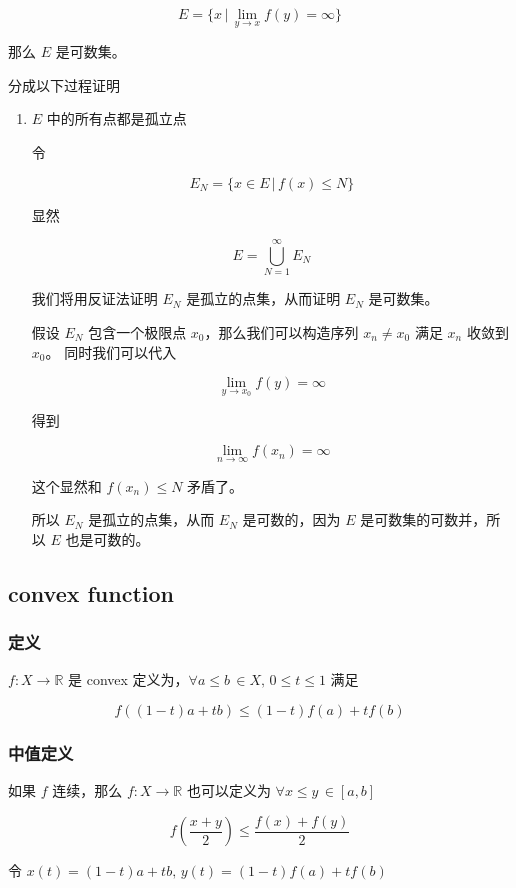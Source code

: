 \documentclass[12pt,a4paper]{ctexart}
\begin{document}
\[
E = \{ x \,\vert\, \lim_{y \to x}f(y) = \infty \}
\]

那么 $E$ 是可数集。

分成以下过程证明

\begin{enumerate}
    \item $E$ 中的所有点都是孤立点

令 

\[
E_N = \{ x \in E \,\vert\, f(x) \le N\}
\]

显然

\[
E = \bigcup_{N=1}^{\infty} E_N
\]

我们将用反证法证明 $E_N$ 是孤立的点集，从而证明 $E_N$ 是可数集。

假设 $E_N$ 包含一个极限点 $x_0$，那么我们可以构造序列 $x_n \ne x_0$ 满足 $x_n$ 收敛到 $x_0$。
同时我们可以代入 

\[
\lim_{y \to x_0}f(y) = \infty
\]

得到

\[
\lim_{n \to \infty}f(x_n) = \infty
\]

这个显然和 $f(x_n) \le N$ 矛盾了。

所以 $E_N$ 是孤立的点集，从而 $E_N$ 是可数的，因为 $E$ 是可数集的可数并，所以 $E$ 也是可数的。


\end{enumerate}

\subsection{convex function}

\subsubsection{定义}

$f: X \to \mathbb{R}$ 是 convex 定义为，$\forall a \le b\, \in X,\, 0 \le t \le 1$ 满足

\[
f((1-t)a + tb) \le (1-t)f(a) + tf(b)
\]

\subsubsection{中值定义}

如果 $f$ 连续，那么 $f: X \to \mathbb{R}$ 也可以定义为 $\forall x \le y\, \in [a,b]$

\[
f(\frac{x+y}{2}) \le \frac{f(x) + f(y)}{2}
\]

令 $x(t) = (1-t)a + tb,\, y(t) = (1-t)f(a) + tf(b)$
\end{document}
